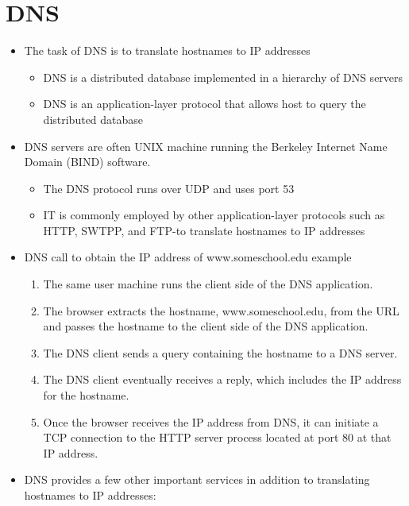 \documentclass[11pt]{article}
\providecommand{\tightlist}{%
      \setlength{\itemsep}{0pt}\setlength{\parskip}{0pt}}
\begin{document}
    \section{DNS}\label{dns}

\begin{itemize}
\tightlist
\item
  The task of DNS is to translate hostnames to IP addresses

  \begin{itemize}
  \tightlist
  \item
    DNS is a distributed database implemented in a hierarchy of DNS
    servers
  \item
    DNS is an application-layer protocol that allows host to query the
    distributed database
  \end{itemize}
\item
  DNS servers are often UNIX machine running the Berkeley Internet Name
  Domain (BIND) software.

  \begin{itemize}
  \tightlist
  \item
    The DNS protocol runs over UDP and uses port 53
  \item
    IT is commonly employed by other application-layer protocols such as
    HTTP, SWTPP, and FTP-to translate hostnames to IP addresses
  \end{itemize}
\item
  DNS call to obtain the IP address of www.someschool.edu example

  \begin{enumerate}
  \def\labelenumi{\arabic{enumi}.}
  \tightlist
  \item
    The same user machine runs the client side of the DNS application.
  \item
    The browser extracts the hostname, www.someschool.edu, from the URL
    and passes the hostname to the client side of the DNS application.
  \item
    The DNS client sends a query containing the hostname to a DNS
    server.
  \item
    The DNS client eventually receives a reply, which includes the IP
    address for the hostname.
  \item
    Once the browser receives the IP address from DNS, it can initiate a
    TCP connection to the HTTP server process located at port 80 at that
    IP address.
  \end{enumerate}
\item
  DNS provides a few other important services in addition to translating
  hostnames to IP addresses:


\end{itemize}
\end{document}
